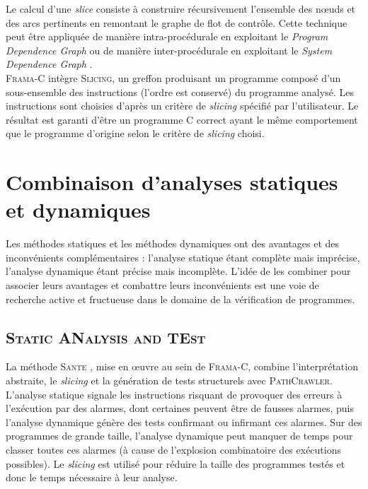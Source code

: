 Le calcul d’une {\em slice} consiste à construire récursivement l’ensemble des
n\oe{}uds et des arcs pertinents en remontant le graphe de flot de contrôle.
Cette technique peut être appliquée de manière intra-procédurale en exploitant
le {\em Program Dependence Graph} \cite{PDG} ou de manière inter-procédurale en
exploitant le {\em System Dependence Graph} \cite{SDG}.\\

\textsc{Frama-C} intègre \textsc{Slicing}, un greffon produisant un programme
composé d'un sous-ensemble des instructions (l'ordre est conservé) du programme
analysé. Les instructions sont choisies d'après un critère de {\em slicing}
spécifié par l'utilisateur. Le résultat est garanti d'être un programme C
correct ayant le même comportement que le programme d'origine selon le critère
de {\em slicing} choisi.


\section{Combinaison d'analyses statiques et dynamiques}
\label{sec:combinaison}

Les méthodes statiques et les méthodes dynamiques ont des avantages et des
inconvénients complémentaires : l'analyse statique étant complète mais
imprécise, l'analyse dynamique étant précise mais incomplète. L’idée de les
combiner pour associer leurs avantages et combattre leurs inconvénients
\cite{duality} est une voie de recherche active et fructueuse dans le domaine de
la vérification de programmes.


\subsection{\textsc{Static ANalysis and TEst}}

La méthode \textsc{Sante} \cite{TheseOmar, SANTE}, mise en \oe{}uvre au sein de
\textsc{Frama-C}, combine l'interprétation abstraite, le {\em slicing} et la
génération de tests structurels avec \textsc{PathCrawler}. L’analyse statique
signale les instructions risquant de provoquer des erreurs à l’exécution par des
alarmes, dont certaines peuvent être de fausses alarmes, puis l’analyse
dynamique génère des tests confirmant ou infirmant ces alarmes. Sur des
programmes de grande taille, l'analyse dynamique peut manquer de temps pour
classer toutes ces alarmes (à cause de l'explosion combinatoire des exécutions
possibles). Le {\em slicing} est utilisé pour réduire la taille des programmes
testés et donc le temps nécessaire à leur analyse.\\

